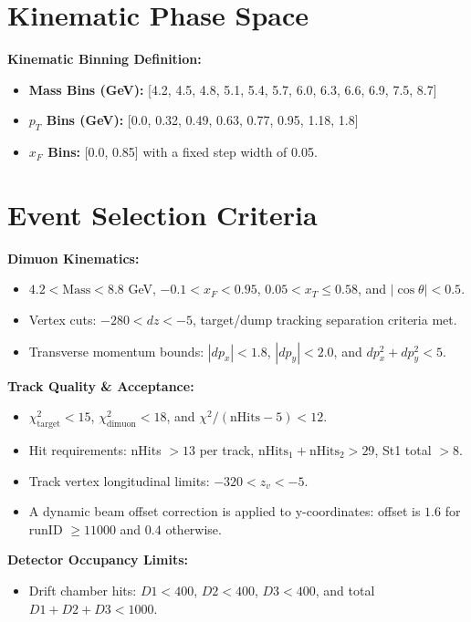 \documentclass[12pt]{article}
\begin{document}
\section{Kinematic Phase Space}

\textbf{Kinematic Binning Definition:}
\begin{itemize}
    \item \textbf{Mass Bins (GeV):} [4.2, 4.5, 4.8, 5.1, 5.4, 5.7, 6.0, 6.3, 6.6, 6.9, 7.5, 8.7]
    \item \textbf{$p_T$ Bins (GeV):} [0.0, 0.32, 0.49, 0.63, 0.77, 0.95, 1.18, 1.8]
    \item \textbf{$x_F$ Bins:} [0.0, 0.85] with a fixed step width of 0.05.
\end{itemize}


\section{Event Selection Criteria}

\textbf{Dimuon Kinematics:}
\begin{itemize}
    \item $4.2 < \text{Mass} < 8.8$ GeV, $-0.1 < x_F < 0.95$, $0.05 < x_T \le 0.58$, and $|\cos\theta| < 0.5$.
    \item Vertex cuts: $-280 < dz < -5$, target/dump tracking separation criteria met.
    \item Transverse momentum bounds: $|dp_x| < 1.8$, $|dp_y| < 2.0$, and $dp_x^2 + dp_y^2 < 5$.
\end{itemize}
\vspace{0.2cm}
\textbf{Track Quality \& Acceptance:}
\begin{itemize}
    \item $\chi^2_{\text{target}} < 15$, $\chi^2_{\text{dimuon}} < 18$, and $\chi^2/(\text{nHits}-5) < 12$.
    \item Hit requirements: nHits $> 13$ per track, $\text{nHits}_1+\text{nHits}_2 > 29$, St1 total $> 8$.
    \item Track vertex longitudinal limits: $-320 < z_v < -5$.
    \item A dynamic beam offset correction is applied to y-coordinates: offset is $1.6$ for runID $\ge 11000$ and $0.4$ otherwise.
\end{itemize}
\vspace{0.2cm}
\textbf{Detector Occupancy Limits:}
\begin{itemize}
    \item Drift chamber hits: $D1 < 400$, $D2 < 400$, $D3 < 400$, and total $D1+D2+D3 < 1000$.
\end{itemize}
\end{document}
